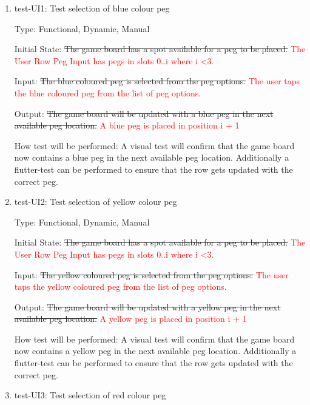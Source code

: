 \documentclass[12pt, titlepage]{article}
\begin{document}
\begin{enumerate}

\item{test-UI1: Test selection of blue colour peg\\}

Type: Functional, Dynamic, Manual
					
Initial State: \sout{The game board has a spot available for a peg to be placed.} \textcolor{red}{The User Row Peg Input has pegs in slots 0..i where i \textless 3.}
					
Input: \sout{The blue coloured peg is selected from the peg options.} \textcolor{red}{The user taps the blue coloured peg from the list of peg options.}
					
Output: \sout{The game board will be updated with a blue peg in the next available peg location.} \textcolor{red}{A blue peg is placed in position i + 1}
					
How test will be performed: A visual test will confirm that the game board now contains a blue peg in the next available peg location. Additionally a flutter-test can be performed to ensure that the row gets updated with the correct peg.\\
					
\item{test-UI2: Test selection of yellow colour peg\\}

Type: Functional, Dynamic, Manual
					
Initial State: \sout{The game board has a spot available for a peg to be placed.} \textcolor{red}{The User Row Peg Input has pegs in slots 0..i where i \textless 3.}
					
Input: \sout{The yellow coloured peg is selected from the peg options.} \textcolor{red}{The user taps the yellow coloured peg from the list of peg options.}
					
Output: \sout{The game board will be updated with a yellow peg in the next available peg location.} \textcolor{red}{A yellow peg is placed in position i + 1}
					
How test will be performed: A visual test will confirm that the game board now contains a yellow peg in the next available peg location. Additionally a flutter-test can be performed to ensure that the row gets updated with the correct peg.\\

\item{test-UI3: Test selection of red colour peg\\}


\end{enumerate}
\end{document}
